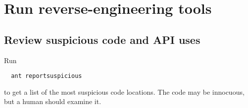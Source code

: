 \section{Run reverse-engineering tools\label{sec:reverse-engineering}}



\subsection{Review suspicious code and API uses}
\label{sec:appanalysis/suspicious}

Run

\begin{Verbatim}
  ant reportsuspicious
\end{Verbatim}

\noindent
to get a list of the most suspicious code
locations. 
The code may be innocuous, but a human should examine it.

